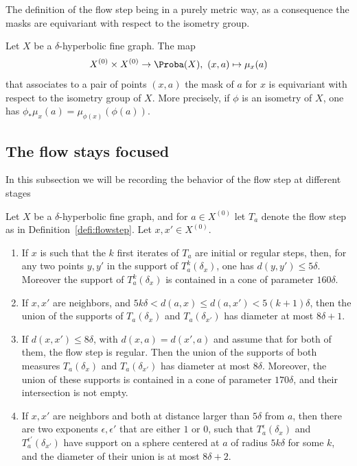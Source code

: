The definition of the flow step being in a purely metric way, as a consequence the masks are equivariant with respect to the isometry group.

\begin{prop}\label{prop;mask_equivariance}
Let $X$ be a $\delta$-hyperbolic fine graph.
The map
\[
X^{(0)}\times X^{(0)}\to\Proba (X),\ (x,a)\mapsto \mu_{x}(a)
\]
that associates to a pair of points $(x,a)$ the mask of $a$ for $x$ is equivariant with respect to the isometry group of $X$. More precisely, if $\phi$ is an isometry of $X$, one has $\phi_*\mu_{x}(a) = \mu_{\phi (x)} (\phi(a))$.
\end{prop}

\subsection{The flow stays focused}

In this subsection we will be recording the behavior of the flow step at different stages

\begin{lemm}\label{focusLemma}
Let $X$ be a $\delta$-hyperbolic fine graph, and for $a\in X^{(0)}$ let $T_a$ denote the flow step as in Definition~\ref{defi:flowstep}. Let $x,x'\in X^{(0)}$.
\begin{enumerate}
\item \label{lem;stayfocus_regular}
If $x$ is such that the $k$ first iterates of $T_a$ are initial or regular steps, then, for any two points $y,y'$ in the support of $T^k_a(\delta_x)$, one has $d(y,y') \leq 5\delta$. Moreover the support of $T^k_a(\delta_x)$ is contained in a cone of parameter $160\delta$.
\item \label{lem;focus_initial}
If $x,x'$ are neighbors, and $5k\delta<d(a,x)\leq d(a,x') < 5(k+1)\delta$, then the union of the supports of $T_a(\delta_x)$ and $T_a(\delta_{x'})$ has diameter at most $8\delta+1$.
\item \label{lem;elementary_confluence}
If $d(x,x')\leq 8\delta$, with $d(x,a) = d(x',a)$ and assume that for both of them, the flow step is regular. Then the union of the supports of both measures $T_a(\delta_x)$ and $T_a(\delta_{x'})$ has diameter at most $8\delta$. Moreover, the union of these supports is contained in a cone of parameter $170 \delta$, and their intersection is not empty.

\item \label{prop;firststep}
If $x,x'$ are neighbors and both at distance larger than $5\delta$ from $a$, then there are two exponents $\epsilon,
\epsilon'$ that are either $1$ or $0$, such that $T^\epsilon_a(\delta_x)$ and $T^{\epsilon'}_a(\delta_{x'})$ have support on a sphere centered at $a$ of radius $5k\delta$ for some $k$, and the diameter of their union is at most $8\delta+2$.
\end{enumerate}
\end{lemm}

